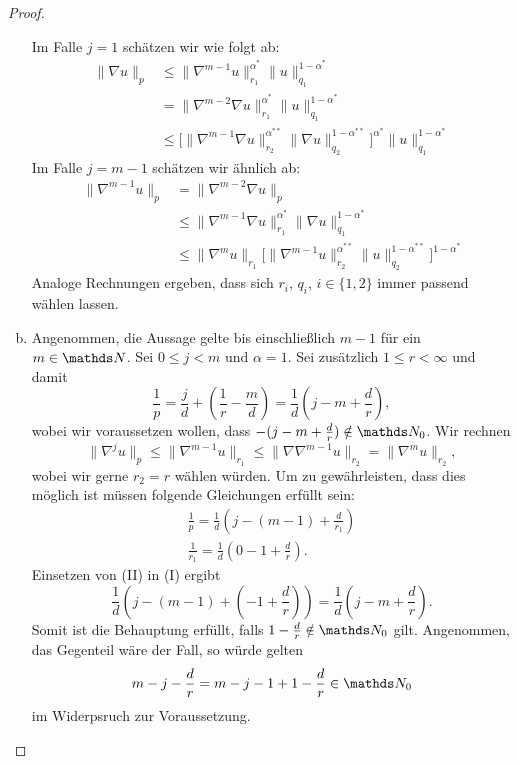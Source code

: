 \begin{proof}
\begin{enumerate}[a)]
      Im Falle $j = 1$ schätzen wir wie folgt ab:
      \begin{align*}
        \| \nabla u\|_p &\leq \|\nabla^{m - 1} u\|_{r_1}^{\alpha^*} \|u\|_{q_1}^{1 - \alpha^*} \\
        &= \|\nabla^{m - 2} \nabla u \|_{r_1}^{\alpha^*} \|u\|_{q_1}^{1 - \alpha^*} \\
        &\leq \Big[ \|\nabla^{m - 1} \nabla u\|_{r_2}^{\alpha^{**}} \|\nabla u\|_{q_2}^{1 - \alpha^{**}} \Big]^{\alpha^*} \|u\|_{q_1}^{1 - \alpha^*}
      \end{align*}
      Im Falle $j = m - 1$ schätzen wir ähnlich ab:
      \begin{align*}
        \| \nabla^{m - 1} u\|_p 
        &= \|\nabla^{m - 2} \nabla u \|_p \\
        &\leq \|\nabla^{m - 1} \nabla u\|_{r_1}^{\alpha^*} \|\nabla u\|_{q_1}^{1 - \alpha^*} \\
        &\leq \|\nabla^{m } u\|_{r_1} \Big[ \|\nabla^{m - 1} u\|_{r_2}^{\alpha^{**}} \|u\|_{q_2}^{1 - \alpha^{**}} \Big]^{1 - \alpha^*}
\end{align*}
Analoge Rechnungen ergeben, dass sich $r_i$, $q_i$, $i \in \{1,2\}$ immer passend wählen lassen.
    \item Angenommen, die Aussage gelte bis einschließlich $m - 1$ für ein $m \in \N$. Sei $0 \leq j < m $ und $\alpha = 1$. 
      Sei zusätzlich $1 \leq r < \infty$ und damit
      $$
      \frac{1}{p} = \frac{j}{d} + (\frac{1}{r} - \frac{m}{d}) = \frac{1}{d} ( j - m + \frac{d}{r}),
      $$
      wobei wir voraussetzen wollen, dass $-(j - m + \frac{d}{r}) \notin \N_0$.
      Wir rechnen
      $$
      \|\nabla^j u\|_p \leq  \|\nabla^{m - 1} u\|_{r_1} \leq \|\nabla \nabla^{m - 1} u\|_{r_2} = \|\nabla^m u\|_{r_2},
      $$
      wobei wir gerne $r_2 = r$ wählen würden.
      Um zu gewährleisten, dass dies möglich ist müssen folgende Gleichungen erfüllt sein:
      \begin{align*}
        \frac{1}{p} = \frac{1}{d}( j - (m - 1) + \frac{d}{r_1} ) \tag{I} \\
        \frac{1}{r_1} = \frac{1}{d} ( 0 - 1 + \frac{d}{r} ) \tag{II}.
      \end{align*}
      Einsetzen von (II) in (I) ergibt
      $$
      \frac{1}{d}( j - (m - 1) + (- 1 + \frac{d}{r})) = \frac{1}{d} (j - m + \frac{d}{r}).
      $$
      Somit ist die Behauptung erfüllt, falls $1 - \frac{d}{r} \notin \N_0$ gilt. Angenommen, das Gegenteil wäre der Fall, so würde gelten
      $$
      m - j - \frac{d}{r} = m - j - 1 + 1 - \frac{d}{r} \in \N_0
      $$
      im Widerpsruch zur Voraussetzung.
  \end{enumerate}


\end{proof}

